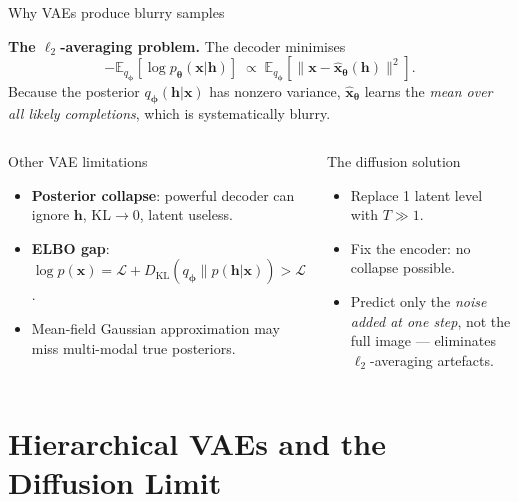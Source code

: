 \documentclass[aspectratio=169,11pt]{beamer}
\newcommand{\E}{\mathbb{E}}
\newcommand{\DKL}{D_{\mathrm{KL}}}
\newcommand{\ELBO}{\mathcal{L}}
\newcommand{\bx}{\bm{x}}
\newcommand{\bh}{\bm{h}}
\newcommand{\btheta}{\bm{\theta}}
\newcommand{\bphi}{\bm{\phi}}
\begin{document}
\begin{frame}{Why VAEs produce blurry samples}

\textbf{The $\ell_2$-averaging problem.}
The decoder minimises
\[
  -\E_{q_{\bphi}}\!\left[\log p_{\btheta}(\bx|\bh)\right]
  \;\propto\;
  \E_{q_{\bphi}}\!\left[\|\bx - \hat{\bx}_{\btheta}(\bh)\|^2\right].
\]
Because the posterior $q_{\bphi}(\bh|\bx)$ has nonzero variance,
$\hat{\bx}_{\btheta}$ learns the \emph{mean over all likely completions},
which is systematically blurry.

\bigskip
\begin{columns}[T]
\begin{block}{Other VAE limitations}
\begin{itemize}
  \item \textbf{Posterior collapse}: powerful decoder can ignore $\bh$,
        KL$\to 0$, latent useless.
  \item \textbf{ELBO gap}:
        $\log p(\bx) = \ELBO + \DKL(q_{\bphi}\|p(\bh|\bx)) > \ELBO$.
  \item Mean-field Gaussian approximation may miss
        multi-modal true posteriors.
\end{itemize}
\end{block}

\begin{alertblock}{The diffusion solution}
\begin{itemize}
  \item Replace 1 latent level with $T\gg 1$.
  \item Fix the encoder: no collapse possible.
  \item Predict only the \emph{noise added at one step},
        not the full image — eliminates $\ell_2$-averaging artefacts.
\end{itemize}
\end{alertblock}
\end{columns}
\end{frame}

\section{Hierarchical VAEs and the Diffusion Limit}
\end{document}
